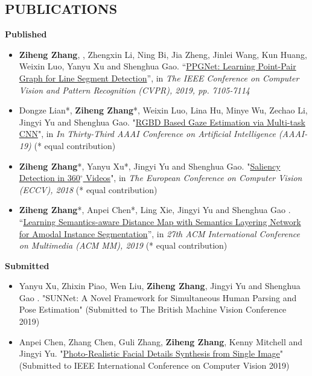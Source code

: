 \documentclass[11pt,a4paper,palatine]{moderncv}        %
\begin{document}
\begin{CJK*}{UTF8}{gbsn}
\section{PUBLICATIONS}
\textbf{Published}
  {\begin{itemize}
    \item  \textbf{Ziheng Zhang}, , Zhengxin Li, Ning Bi, Jia Zheng, Jinlei Wang, Kun Huang, Weixin Luo, Yanyu Xu and Shenghua Gao. “\href{https://www.aiyoggle.me/publication/ppgnet-cvpr19/ppgnet-cvpr19.pdf}{PPGNet: Learning Point-Pair Graph for Line Segment Detection}”, in \textit{The IEEE Conference on Computer Vision and Pattern Recognition (CVPR), 2019, pp. 7105-7114}
    \item Dongze Lian*, \textbf{Ziheng Zhang}*, Weixin Luo, Lina Hu, Minye Wu, Zechao Li, Jingyi Yu and Shenghua Gao. "\href{https://www.aiyoggle.me/publication/gaze-aaai19/gaze-aaai19.pdf}{RGBD Based Gaze Estimation via Multi-task CNN}", in \textit{In Thirty-Third AAAI Conference on Artificial Intelligence (AAAI-19)} (* equal contribution)
    \item \textbf{Ziheng Zhang}*, Yanyu Xu*, Jingyi Yu and Shenghua Gao. "\href{http://openaccess.thecvf.com/content_ECCV_2018/papers/Ziheng_Zhang_Saliency_Detection_in_ECCV_2018_paper.pdf}{Saliency Detection in 360$^\circ$ Videos}", in \textit{The European Conference on Computer Vision (ECCV), 2018} (* equal contribution)
    \item  \textbf{Ziheng Zhang}*, Anpei Chen*, Ling Xie, Jingyi Yu and Shenghua Gao . “\href{https://arxiv.org/pdf/1905.12898}{Learning Semantics-aware Distance Map with Semantics Layering Network for Amodal Instance Segmentation}”, in \textit{27th ACM International Conference on Multimedia (ACM MM), 2019} (* equal contribution)
  \end{itemize}
  }
\textbf{Submitted}
  {\begin{itemize}
    \item Yanyu Xu, Zhixin Piao, Wen Liu, \textbf{Ziheng Zhang}, Jingyi Yu and Shenghua Gao . "SUNNet: A Novel Framework for Simultaneous Human Parsing and Pose Estimation" (Submitted to The British Machine Vision Conference 2019)
    \item Anpei Chen, Zhang Chen, Guli Zhang, \textbf{Ziheng Zhang}, Kenny Mitchell and Jingyi Yu. "\href{https://arxiv.org/pdf/1903.10873}{Photo-Realistic Facial Details Synthesis from Single Image}" (Submitted to IEEE International Conference on Computer Vision 2019)
  \end{itemize}
  }


\end{CJK*}
\end{document}
